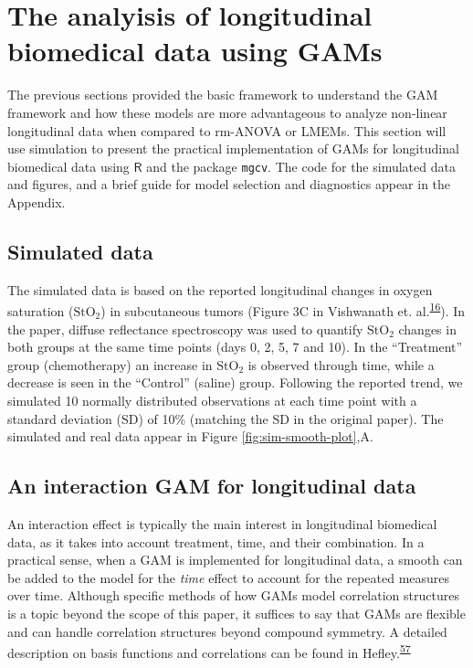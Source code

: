 \documentclass[
]{article}
\newcommand{\passthrough}[1]{#1}
\begin{document}
\hypertarget{longitudinal-GAMs}{%
\section{The analyisis of longitudinal biomedical data using GAMs}\label{longitudinal-GAMs}}

The previous sections provided the basic framework to understand the GAM framework and how these models are more advantageous to analyze non-linear longitudinal data when compared to rm-ANOVA or LMEMs. This section will use simulation to present the practical implementation of GAMs for longitudinal biomedical data using \(\textsf{R}\) and the package \passthrough{\lstinline!mgcv!}. The code for the simulated data and figures, and a brief guide for model selection and diagnostics appear in the Appendix.

\hypertarget{simulated-data}{%
\subsection{Simulated data}\label{simulated-data}}

The simulated data is based on the reported longitudinal changes in oxygen saturation (\(\mbox{StO}_2\)) in subcutaneous tumors (Figure 3C in Vishwanath et. al.\textsuperscript{\protect\hyperlink{ref-vishwanath2009}{16}}). In the paper, diffuse reflectance spectroscopy was used to quantify \(\mbox{StO}_2\) changes in both groups at the same time points (days 0, 2, 5, 7 and 10). In the ``Treatment'' group (chemotherapy) an increase in \(\mbox{StO}_2\) is observed through time, while a decrease is seen in the ``Control'' (saline) group. Following the reported trend, we simulated 10 normally distributed observations at each time point with a standard deviation (SD) of 10\% (matching the SD in the original paper).
The simulated and real data appear in Figure \ref{fig:sim-smooth-plot},A.

\hypertarget{an-interaction-gam-for-longitudinal-data}{%
\subsection{An interaction GAM for longitudinal data}\label{an-interaction-gam-for-longitudinal-data}}

An interaction effect is typically the main interest in longitudinal biomedical data, as it takes into account treatment, time, and their combination. In a practical sense, when a GAM is implemented for longitudinal data, a smooth can be added to the model for the \emph{time} effect to account for the repeated measures over time. Although specific methods of how GAMs model correlation structures is a topic beyond the scope of this paper, it suffices to say that GAMs are flexible and can handle correlation structures beyond compound symmetry. A detailed description on basis functions and correlations can be found in Hefley.\textsuperscript{\protect\hyperlink{ref-hefley2017}{57}}
\end{document}
